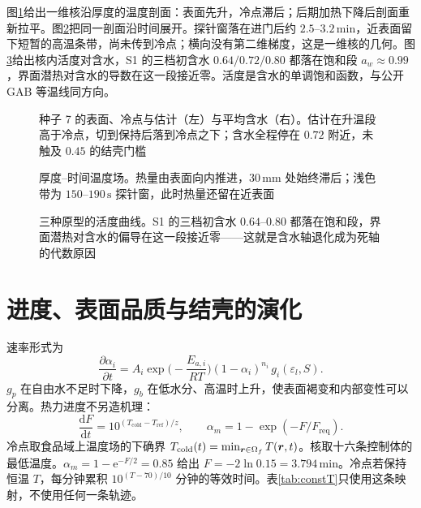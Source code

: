 图\ref{fig:profiles}{}给出一维核沿厚度的温度剖面：表面先升，冷点滞后；后期加热下降后剖面重新拉平。图\ref{fig:xt}{}把同一剖面沿时间展开。探针窗落在进门后约 \(2.5\)--\(3.2\,\mathrm{min}\)，近表面留下短暂的高温条带，尚未传到冷点；横向没有第二维梯度，这是一维核的几何。图\ref{fig:paw}{}给出核内活度对含水，S1 的三档初含水 \(0.64/0.72/0.80\) 都落在饱和段 \(a_w\approx 0.99\)，界面潜热对含水的导数在这一段接近零。活度是含水的单调饱和函数，与公开 GAB 等温线同方向。

\begin{figure}[t]
\centering
{}
\caption{种子 7 的表面、冷点与估计（左）与平均含水（右）。估计在升温段高于冷点，切到保持后落到冷点之下；含水全程停在 $0.72$ 附近，未触及 $0.45$ 的结壳门槛}
\label{fig:profiles}
\end{figure}

\begin{figure}[htbp]
\centering
{}
\caption{厚度--时间温度场。热量由表面向内推进，$30\,\mathrm{mm}$ 处始终滞后；浅色带为 $150$--$190\,\mathrm{s}$ 探针窗，此时热量还留在近表面}
\label{fig:xt}
\end{figure}

\begin{figure}[htbp]
\centering
{}
\caption{三种原型的活度曲线。S1 的三档初含水 $0.64$--$0.80$ 都落在饱和段，界面潜热对含水的偏导在这一段接近零——这就是含水轴退化成为死轴的代数原因}
\label{fig:paw}
\end{figure}

\section{进度、表面品质与结壳的演化}

速率形式为
\begin{equation}
\label{eq:kinetics}
\frac{\partial\alpha_i}{\partial t}
=A_i\exp\!\Big(-\frac{E_{a,i}}{RT}\Big)
(1-\alpha_i)^{n_i}\,g_i(\varepsilon_l,S).
\end{equation}
\(g_p\) 在自由水不足时下降，\(g_b\) 在低水分、高温时上升，使表面褐变和内部变性可以分离。热力进度不另造机理：
\begin{equation}
\label{eq:F}
\frac{\mathrm{d}F}{\mathrm{d}t}=10^{(T_{\mathrm{cold}}-T_{\mathrm{ref}})/z},\qquad
\alpha_m=1-\exp(-F/F_{\mathrm{req}}).
\end{equation}
冷点取食品域上温度场的下确界 \(T_{\mathrm{cold}}(t)=\min_{\bm{r}\in\Omega_f}T(\bm{r},t)\)。核取十六条控制体的最低温度。\(\alpha_m=1-\mathrm{e}^{-F/2}=0.85\) 给出 \(F=-2\ln 0.15=3.794\,\mathrm{min}\)。冷点若保持恒温 \(T\)，每分钟累积 \(10^{(T-70)/10}\) 分钟的等效时间。表\ref{tab:constT}{}只使用这条映射，不使用任何一条轨迹。

